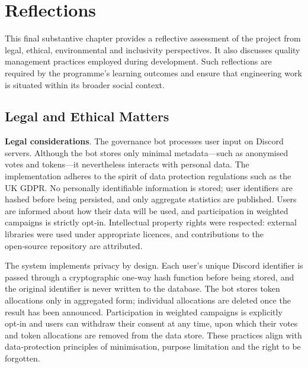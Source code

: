 \doublespacing %

\chapter{Reflections}
\label{chLast}

\begin{spacing}{1} %
\minitoc %
\end{spacing} %
\thesisspacing %


This final substantive chapter provides a reflective assessment of the
project from legal, ethical, environmental and inclusivity perspectives.
It also discusses quality management practices employed during
development.  Such reflections are required by the programme’s learning
outcomes and ensure that engineering work is situated within its broader
social context.

\section{Legal and Ethical Matters}

\textbf{Legal considerations}.  The governance bot processes user input on
Discord servers.  Although the bot stores only minimal metadata—such as
anonymised votes and tokens—it nevertheless interacts with personal data.
The implementation adheres to the spirit of data protection regulations
such as the UK GDPR.  No personally identifiable information is stored;
user identifiers are hashed before being persisted, and only aggregate
statistics are published.  Users are informed about how their data will
be used, and participation in weighted campaigns is strictly opt‑in.
Intellectual property rights were respected: external libraries were used
under appropriate licences, and contributions to the open‑source
repository are attributed.

The system implements privacy by design.  Each user’s unique Discord identifier
is passed through a cryptographic one‑way hash function before being
stored, and the original identifier is never written to the database.
The bot stores token allocations only in aggregated form; individual
allocations are deleted once the result has been announced.
Participation in weighted campaigns is explicitly opt‑in and users can
withdraw their consent at any time, upon which their votes and token
allocations are removed from the data store.  These practices align
with data‑protection principles of minimisation, purpose limitation
and the right to be forgotten.

